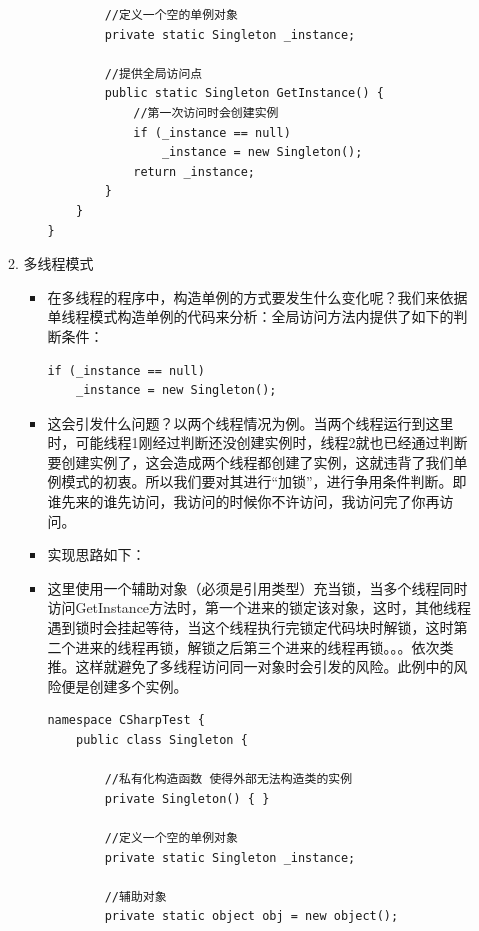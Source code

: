 \documentclass[9pt, b5paper]{article}
\begin{document}
\begin{enumerate}
\begin{enumerate}
\begin{itemize}
\begin{verbatim}
        //定义一个空的单例对象
        private static Singleton _instance;

        //提供全局访问点
        public static Singleton GetInstance() {
            //第一次访问时会创建实例
            if (_instance == null)
                _instance = new Singleton();
            return _instance;
        }
    }
}
\end{verbatim}
\end{itemize}
\item 多线程模式
\label{sec:org8c45f78}
\begin{itemize}
\item 在多线程的程序中，构造单例的方式要发生什么变化呢？我们来依据单线程模式构造单例的代码来分析：全局访问方法内提供了如下的判断条件：
\begin{verbatim}
if (_instance == null)
    _instance = new Singleton();
\end{verbatim}
\item 这会引发什么问题？以两个线程情况为例。当两个线程运行到这里时，可能线程1刚经过判断还没创建实例时，线程2就也已经通过判断要创建实例了，这会造成两个线程都创建了实例，这就违背了我们单例模式的初衷。所以我们要对其进行“加锁”，进行争用条件判断。即谁先来的谁先访问，我访问的时候你不许访问，我访问完了你再访问。
\item 实现思路如下：
\item 这里使用一个辅助对象（必须是引用类型）充当锁，当多个线程同时访问GetInstance方法时，第一个进来的锁定该对象，这时，其他线程遇到锁时会挂起等待，当这个线程执行完锁定代码块时解锁，这时第二个进来的线程再锁，解锁之后第三个进来的线程再锁。。。依次类推。这样就避免了多线程访问同一对象时会引发的风险。此例中的风险便是创建多个实例。
\begin{verbatim}
namespace CSharpTest {
    public class Singleton {
        
        //私有化构造函数 使得外部无法构造类的实例
        private Singleton() { }
        
        //定义一个空的单例对象
        private static Singleton _instance;
        
        //辅助对象
        private static object obj = new object();
        

\end{verbatim}
\end{itemize}
\end{enumerate}
\end{enumerate}
\end{document}
